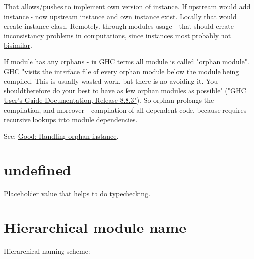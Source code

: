 \documentclass[a4paper,14pt,oneside]{book}
\begin{document}
That allows/pushes to implement own version of instance. If upstream would add instance - now upstream instance and own instance exist. Locally that would create instance clash. Remotely, through modules usage - that should create inconsistancy problems in computations, since instances most probably not \hyperref[orgb941036]{bisimilar}.

If \hyperref[org763755b]{module} has any orphans - in GHC terms all \hyperref[org763755b]{module} is called "orphan \hyperref[org763755b]{module}". GHC "visits the \hyperref[org2ad988e]{interface} file of every orphan \hyperref[org763755b]{module} below the \hyperref[org763755b]{module} being compiled. This is usually wasted work, but there is no avoiding it. You shouldtherefore do your best to have as few orphan modules as possible" (\href{https://downloads.haskell.org/\~ghc/latest/docs/users\_guide.pdf}{"GHC User’s Guide Documentation, Release 8.8.3"}). So orphan prolongs the compilation, and moreover - compilation of all dependent code, because requires \hyperref[org955a4a1]{recursive} lookups into \hyperref[org763755b]{module} dependencies.

See: \hyperref[org9483bc3]{Good: Handling orphan instance}.

\section{\label{orgc30e353}undefined}
\label{sec:org48180bf}
Placeholder value that helps to do \hyperref[org0d4727c]{typechecking}.

\section{\label{org012d61d}Hierarchical module name}
\label{sec:org2ce57c0}
Hierarchical naming scheme:
\end{document}
